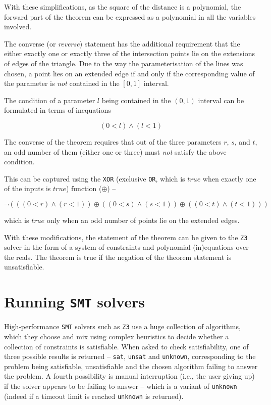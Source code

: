 \documentclass{amsart}
\theoremstyle{plain}
\theoremstyle{definition}
\theoremstyle{remark}
\begin{document}
With these simplifications, as the square of the distance is a polynomial, the forward part of the theorem can be expressed as a polynomial in all the variables involved.

The converse (or \emph{reverse}) statement has the additional requirement that the either exactly one or exactly three of the intersection points lie on the extensions of edges of the triangle. Due to the way the parameterisation of the lines was chosen, a point lies on an extended edge if and only if the corresponding value of the parameter is \emph{not} contained in the \(\left[0, 1\right]\) interval.

The condition of a parameter $l$ being contained in the \(\left(0, 1\right)\) interval can be formulated in terms of inequations

$$
	(0 < l) \wedge (l < 1)
$$

The converse of the theorem requires that out of the three parameters \(r\), \(s\), and \(t\), an odd number of them (either one or three) must \emph{not} satisfy the above condition.

This can be captured using the \texttt{XOR} (exclusive \texttt{OR}, which is $true$ when exactly one of the inputs is $true$) function ($\oplus$) --

$$
	\neg \left( \left( (0 < r) \wedge (r < 1) \right) \oplus \left( (0 < s) \wedge (s < 1) \right) \oplus \left( (0 < t) \wedge (t < 1) \right) \right)
$$

which is \(true\) only when an odd number of points lie on the extended edges.

With these modifications, the statement of the theorem can be given to the \texttt{Z3} solver in the form of a system of constraints and polynomial (in)equations over the reals.
The theorem is true if the negation of the theorem statement is unsatisfiable.

\section{Running \texttt{SMT} solvers}\label{running-smt-solvers}

High-performance \texttt{SMT} solvers such as \texttt{Z3} use a huge collection of algorithms, which they
choose and mix using complex heuristics to decide whether a collection
of constraints is satisfiable. When asked to check satisfiability, one of three possible
results is returned -- \texttt{sat}, \texttt{unsat} and \texttt{unknown}, corresponding to
the problem being satisfiable, unsatisfiable and the chosen algorithm failing to answer
the problem. A fourth possibility is manual interruption (i.e., the user giving up) if the solver appears to be failing
to answer -- which is a variant of \texttt{unknown} (indeed if a timeout limit is reached \texttt{unknown} is returned).
\end{document}
